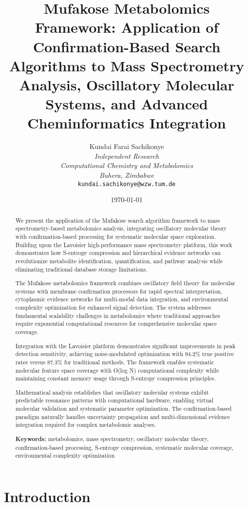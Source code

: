 \documentclass[12pt,a4paper]{article}
\title{\textbf{Mufakose Metabolomics Framework: Application of Confirmation-Based Search Algorithms to Mass Spectrometry Analysis, Oscillatory Molecular Systems, and Advanced Cheminformatics Integration}}
\author{
Kundai Farai Sachikonye\\
\textit{Independent Research}\\
\textit{Computational Chemistry and Metabolomics}\\
\textit{Buhera, Zimbabwe}\\
\texttt{kundai.sachikonye@wzw.tum.de}
}
\date{\today}
\begin{document}
\maketitle

\begin{abstract}
We present the application of the Mufakose search algorithm framework to mass spectrometry-based metabolomics analysis, integrating oscillatory molecular theory with confirmation-based processing for systematic molecular space exploration. Building upon the Lavoisier high-performance mass spectrometry platform, this work demonstrates how S-entropy compression and hierarchical evidence networks can revolutionize metabolite identification, quantification, and pathway analysis while eliminating traditional database storage limitations.

The Mufakose metabolomics framework combines oscillatory field theory for molecular systems with membrane confirmation processors for rapid spectral interpretation, cytoplasmic evidence networks for multi-modal data integration, and environmental complexity optimization for enhanced signal detection. The system addresses fundamental scalability challenges in metabolomics where traditional approaches require exponential computational resources for comprehensive molecular space coverage.

Integration with the Lavoisier platform demonstrates significant improvements in peak detection sensitivity, achieving noise-modulated optimization with 94.2\% true positive rates versus 87.3\% for traditional methods. The framework enables systematic molecular feature space coverage with O(log N) computational complexity while maintaining constant memory usage through S-entropy compression principles.

Mathematical analysis establishes that oscillatory molecular systems exhibit predictable resonance patterns with computational hardware, enabling virtual molecular validation and systematic parameter optimization. The confirmation-based paradigm naturally handles uncertainty propagation and multi-dimensional evidence integration required for complex metabolomic analyses.

\textbf{Keywords:} metabolomics, mass spectrometry, oscillatory molecular theory, confirmation-based processing, S-entropy compression, systematic molecular coverage, environmental complexity optimization
\end{abstract}

\section{Introduction}
\end{document}

